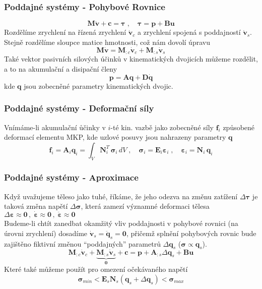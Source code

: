 	\begin{frame}
		\frametitle{Poddajné systémy - Pohybové Rovnice}

		\begin{equation*}
			\bm{M}\bm{\dot{v}} + \bm{c} = \bm{\tau}
			\;,\quad 
			\bm{\tau} = \bm{p} + \bm{B}\bm{u}
		\end{equation*}
		Rozdělíme zrychlení na řízená zrychlení $\bm{\dot{v}}_c$ a zrychlení spojená s poddajností $\bm{\dot{v}}_s$. Stejně rozdělíme sloupce matice hmotnosti, což nám dovolí úpravu
		\begin{equation*}
			\bm{M}\bm{\dot{v}} = \bm{M}_{:c} \bm{\dot{v}}_c + \bm{M}_{:s} \bm{\dot{v}}_s
		\end{equation*}
		Také vektor pasivních silových účinků v kinematických dvojicích můžeme rozdělit, a to na akumulační a disipační členy
		\begin{equation*}
			\bm{p} = \bm{A}\bm{q} + \bm{D}\bm{\dot{q}}
		\end{equation*}
		kde $\bm{q}$ jsou zobecněné parametry kinematických dvojic.
	\end{frame}

	\begin{frame}
		\frametitle{Poddajné systémy - Deformační síly}
		Vnímáme-li akumulační ůčinky v $i$-té kin. vazbě jako zobecněné síly $\bm{f}_i$ způsobené deformací elementu MKP, kde uzlové posuvy jsou nahrazeny parametry $\bm{q}$
		\begin{equation*}
			\bm{f}_i
			=
			\bm{A}_i\bm{q}_i
			=
			\int_{V} \bm{N}_i^T  \, \bm{\sigma}_i \, dV
			\;,\quad 
			\bm{\sigma}_i = \bm{E}_i \bm{\varepsilon}_i
			\;,\quad 
			\bm{\varepsilon}_i = \bm{N}_i \, \bm{q}_i 
		\end{equation*}
	\end{frame}

	\begin{frame}
		\frametitle{Poddajné systémy - Aproximace}
		Když uvažujeme těleso jako tuhé, říkáme, že jeho odezva na změnu zatížení $\Delta\bm{\tau}$ je taková změna napětí $\Delta\bm{\sigma}$, která zamezí významné deformaci tělesa $\Delta\bm{\varepsilon} \approx \bm{0} \,,\; \bm{\dot{\varepsilon}} \approx \bm{0} \,,\; \bm{\ddot{\varepsilon}} \approx \bm{0}$
		\\\vspace{1em}
		Budeme-li chtít zanedbat okamžitý vliv poddajnosti v pohybové rovnici (na úrovni zrychlení) dosadíme $\bm{\dot{v}}_s = \bm{\ddot{q}}_s = \bm{0}$, přičemž splnění pohybových rovnic bude zajištěno fiktivní změnou ``poddajných'' parametrů $\Delta\bm{q}_s$ ($\bm{\sigma} \propto \bm{q}_s$).
		\begin{equation*}
			\bm{M}_{:c} \bm{\dot{v}}_c +
			\underbrace{\bm{M}_{:s} \bm{\dot{v}}_s}_{\bm{0}} +
			\bm{c} = \bm{p} + \bm{A}_{:s} \Delta\bm{q}_s + \bm{B}\bm{u}
		\end{equation*}
		Které také můžeme použít pro omezení očekávaného napětí
		\begin{equation*}
			\bm{\sigma}_{min} < \bm{E}_s\bm{N}_s(\bm{q}_s + \Delta \bm{q}_s) < \bm{\sigma}_{max}
		\end{equation*}
		
	\end{frame}

